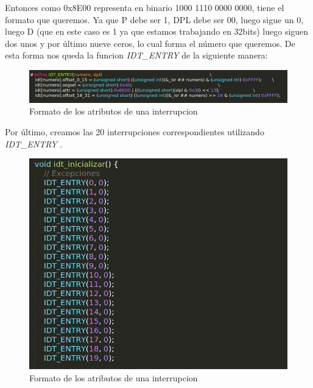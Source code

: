 Entonces como 0x8E00 representa en binario 1000 1110 0000 0000, tiene el formato que queremos. Ya que P debe ser 1, DPL debe ser 00, luego sigue un 0, luego D (que en este caso es 1 ya que estamos trabajando en 32bits) luego siguen dos unos y por último nueve ceros, lo cual forma el número que queremos. De esta forma nos queda la funcion \textit{IDT\_ENTRY} de la siguiente manera:

 \begin{figure}[H]
\begin{center}
  \includegraphics[width=\linewidth]{ejercicio2/idtentry.png}
  \caption{{\small Formato de los atributos de una interrupcion} }
\endminipage
\end{center}
\end{figure}

Por último, creamos las 20 interrupciones correspondientes utilizando \textit{IDT\_ENTRY}  .

 \begin{figure}[H]
\begin{center}
  \includegraphics[width=\linewidth]{ejercicio2/idt.png}
  \caption{{\small Formato de los atributos de una interrupcion} }
\endminipage
\end{center}
\end{figure}
